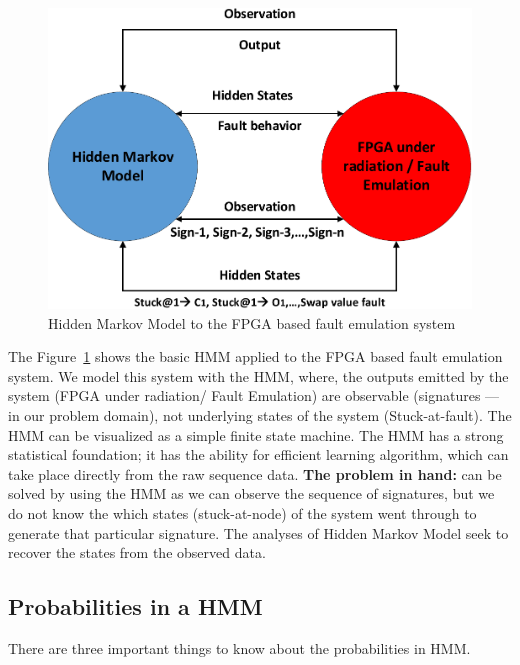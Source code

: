 \begin{figure}[tb!]

 \centering
  \captionsetup{justification=centering}    
   \includegraphics[scale=0.8]{Figures/HMM-air.pdf}
   \caption{Hidden Markov Model to the FPGA based fault emulation system}
\label{fig:HMM-air}
\end{figure}


The Figure~\ref{fig:HMM-air} shows the basic HMM applied to the FPGA based fault emulation system. We model this system with the HMM, where, the outputs emitted by the system (FPGA under radiation/ Fault Emulation) are observable (signatures --- in our problem domain), not underlying states of the system (Stuck-at-fault). The HMM can be visualized as a simple finite state machine. The HMM has a strong statistical foundation; it has the ability for efficient learning algorithm, which can take place directly from the raw sequence data. \textbf{The problem in hand:} can be solved by using the HMM as we can observe the sequence of signatures, but we do not know the which states (stuck-at-node) of the system went through to generate that particular signature. The analyses of Hidden Markov Model seek to recover the states from the observed data.








\subsection{Probabilities in a HMM}

There are three important things to know about the probabilities in HMM.


